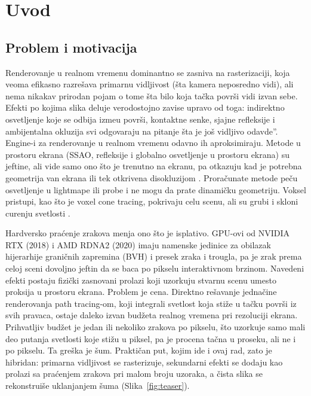 \chapter{Uvod}
\label{ch:uvod}

\section{Problem i motivacija}

Renderovanje u realnom vremenu dominantno se zasniva na rasterizaciji, koja veoma efikasno
razre\v{s}ava primarnu vidljivost (\v{s}ta kamera neposredno vidi), ali nema nikakav prirodan pojam o tome
\v{s}ta bilo koja ta\v{c}ka povr\v{s}i vidi izvan sebe. Efekti po kojima slika deluje verodostojno zavise upravo
od toga: indirektno osvetljenje koje se odbija izme\dj u povr\v{s}i, kontaktne senke, sjajne refleksije i
ambijentalna okluzija svi odgovaraju na pitanje \quotedblbase{}\v{s}ta je jo\v{s} vidljivo odavde\textquotedblright{}. Engine-i za
renderovanje u realnom vremenu odavno ih aproksimiraju. Metode u prostoru ekrana (SSAO, refleksije i
globalno osvetljenje u prostoru ekrana) su jeftine, ali vide samo ono \v{s}to je trenutno na ekranu, pa
otkazuju kad je potrebna geometrija van ekrana ili tek otkrivena disokluzijom
\cite{mittring2007cryengine, bavoil2008hbao}. Prora\v{c}unate metode pe\v{c}u osvetljenje u lightmape ili
probe i ne mogu da prate dinami\v{c}ku geometriju. Voksel pristupi, kao \v{s}to je voxel cone tracing, pokrivaju
celu scenu, ali su grubi i skloni curenju svetlosti \cite{crassin2011vxgi}.

Hardversko pra\'cenje zrakova menja ono \v{s}to je isplativo. GPU-ovi od NVIDIA RTX (2018) i AMD RDNA2 (2020)
imaju namenske jedinice za obilazak hijerarhije grani\v{c}nih zapremina (BVH) i presek zraka i trougla, pa je
zrak prema celoj sceni dovoljno jeftin da se baca po pikselu interaktivnom brzinom. Navedeni efekti
postaju fizi\v{c}ki zasnovani prolazi koji uzorkuju stvarnu scenu umesto proksija u prostoru ekrana.
Problem je cena. Direktno re\v{s}avanje jedna\v{c}ine renderovanja \cite{kajiya1986rendering} path tracing-om,
koji integrali svetlost koja sti\v{z}e u ta\v{c}ku povr\v{s}i iz svih pravaca, ostaje daleko izvan bud\v{z}eta
realnog vremena pri rezoluciji ekrana. Prihvatljiv bud\v{z}et je jedan ili nekoliko zrakova po pikselu, \v{s}to
uzorkuje samo mali deo putanja svetlosti koje sti\v{z}u u piksel, pa je procena ta\v{c}na u proseku, ali ne i po
pikselu. Ta gre\v{s}ka je \v{s}um. Prakti\v{c}an put, kojim ide i ovaj rad, zato je hibridan: primarna
vidljivost se rasterizuje, sekundarni efekti se dodaju kao prolazi sa pra\'cenjem zrakova pri malom broju
uzoraka, a \v{c}ista slika se rekonstrui\v{s}e uklanjanjem \v{s}uma \cite{schied2017svgf}
(Slika~\ref{fig:teaser}).

